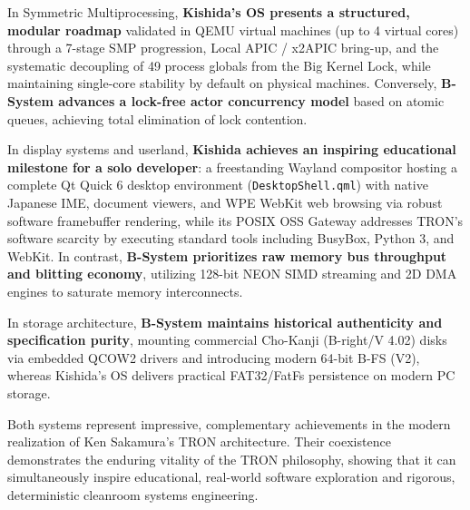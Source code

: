 \documentclass[10pt,journal,compsoc,twocolumn]{article}
\begin{document}
In Symmetric Multiprocessing, \textbf{Kishida's OS presents a structured, modular roadmap} validated in QEMU virtual machines (up to 4 virtual cores) through a 7-stage SMP progression, Local APIC / x2APIC bring-up, and the systematic decoupling of 49 process globals from the Big Kernel Lock, while maintaining single-core stability by default on physical machines. Conversely, \textbf{B-System advances a lock-free actor concurrency model} based on atomic queues, achieving total elimination of lock contention.

In display systems and userland, \textbf{Kishida achieves an inspiring educational milestone for a solo developer}: a freestanding Wayland compositor hosting a complete Qt Quick 6 desktop environment (\texttt{DesktopShell.qml}) with native Japanese IME, document viewers, and WPE WebKit web browsing via robust software framebuffer rendering, while its POSIX OSS Gateway addresses TRON's software scarcity by executing standard tools including BusyBox, Python 3, and WebKit. In contrast, \textbf{B-System prioritizes raw memory bus throughput and blitting economy}, utilizing 128-bit NEON SIMD streaming and 2D DMA engines to saturate memory interconnects.

In storage architecture, \textbf{B-System maintains historical authenticity and specification purity}, mounting commercial Cho-Kanji (B-right/V 4.02) disks via embedded QCOW2 drivers and introducing modern 64-bit B-FS (V2), whereas Kishida's OS delivers practical FAT32/FatFs persistence on modern PC storage.

Both systems represent impressive, complementary achievements in the modern realization of Ken Sakamura's TRON architecture. Their coexistence demonstrates the enduring vitality of the TRON philosophy, showing that it can simultaneously inspire educational, real-world software exploration and rigorous, deterministic cleanroom systems engineering.
\end{document}
